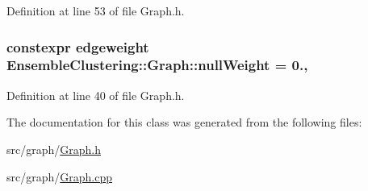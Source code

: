 Definition at line 53 of file Graph.\-h.

\hypertarget{class_ensemble_clustering_1_1_graph_a54efbdf82d76bdb85d01ffc7f2e6a3b4}{
\subsubsection[{null\-Weight}]{\setlength{\rightskip}{0pt plus 5cm}constexpr {\bf edgeweight} Ensemble\-Clustering\-::\-Graph\-::null\-Weight = 0.\hspace{0.3cm}{\ttfamily [static]}, {\ttfamily [protected]}}}\label{class_ensemble_clustering_1_1_graph_a54efbdf82d76bdb85d01ffc7f2e6a3b4}


Definition at line 40 of file Graph.\-h.



The documentation for this class was generated from the following files\-:\begin{DoxyCompactItemize}
\item 
src/graph/\hyperlink{_graph_8h}{Graph.\-h}\item 
src/graph/\hyperlink{_graph_8cpp}{Graph.\-cpp}\end{DoxyCompactItemize}
